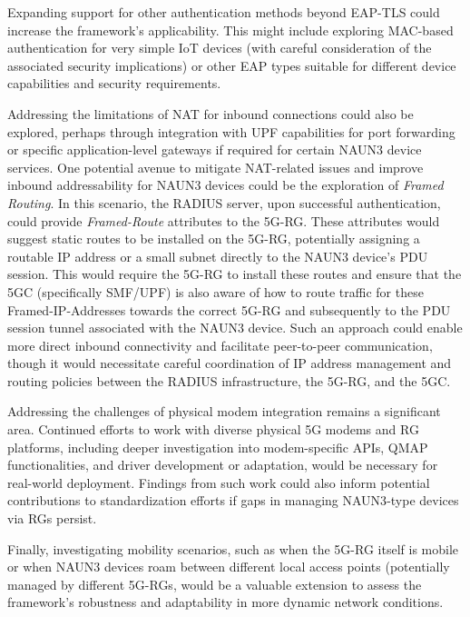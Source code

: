 Expanding support for other authentication methods beyond \ac{EAP-TLS} could increase the framework's applicability. This might include exploring \ac{MAC}-based authentication for very simple \ac{IoT} devices (with careful consideration of the associated security implications) or other \ac{EAP} types suitable for different device capabilities and security requirements.

Addressing the limitations of NAT for inbound connections could also be explored, perhaps through integration with \ac{UPF} capabilities for port forwarding or specific application-level gateways if required for certain \ac{NAUN3} device services. One potential avenue to mitigate \ac{NAT}-related issues and improve inbound addressability for \ac{NAUN3} devices could be the exploration of \textit{Framed Routing}. In this scenario, the \ac{RADIUS} server, upon successful authentication, could provide \textit{Framed-Route} attributes to the \ac{5G-RG}. These attributes would suggest static routes to be installed on the \ac{5G-RG}, potentially assigning a routable \ac{IP} address or a small subnet directly to the \ac{NAUN3} device's \ac{PDU} session. This would require the \ac{5G-RG} to install these routes and ensure that the \ac{5GC} (specifically \ac{SMF}/\ac{UPF}) is also aware of how to route traffic for these Framed-\ac{IP}-Addresses towards the correct \ac{5G-RG} and subsequently to the \ac{PDU} session tunnel associated with the \ac{NAUN3} device. Such an approach could enable more direct inbound connectivity and facilitate peer-to-peer communication, though it would necessitate careful coordination of \ac{IP} address management and routing policies between the \ac{RADIUS} infrastructure, the \ac{5G-RG}, and the \ac{5GC}.

Addressing the challenges of physical modem integration remains a significant area. Continued efforts to work with diverse physical \ac{5G} modems and \ac{RG} platforms, including deeper investigation into modem-specific \acp{API}, \ac{QMAP} functionalities, and driver development or adaptation, would be necessary for real-world deployment. Findings from such work could also inform potential contributions to standardization efforts if gaps in managing \ac{NAUN3}-type devices via \acp{RG} persist.

Finally, investigating mobility scenarios, such as when the \ac{5G-RG} itself is mobile or when \ac{NAUN3} devices roam between different local access points (potentially managed by different \acp{5G-RG}, would be a valuable extension to assess the framework's robustness and adaptability in more dynamic network conditions.

